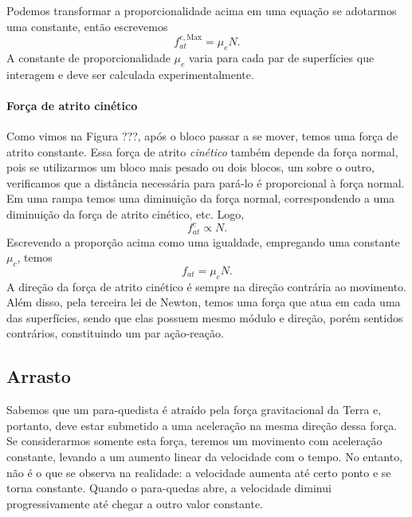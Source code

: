 Podemos transformar a proporcionalidade acima em uma equação se adotarmos uma constante, então escrevemos
\begin{equation}
  f_{at}^{e, \textrm{Max}} = \mu_e N.
\end{equation}
%
A constante de proporcionalidade $\mu_e$ varia para cada par de superfícies que interagem e deve ser calculada experimentalmente.

\paragraph{Força de atrito cinético} 

Como vimos na Figura ???, após o bloco passar a se mover, temos uma força de atrito constante. Essa força de atrito \emph{cinético} também depende da força normal, pois se utilizarmos um bloco mais pesado ou dois blocos, um sobre o outro, verificamos que a distância necessária para pará-lo é proporcional à força normal. Em uma rampa temos uma diminuição da força normal, correspondendo a uma diminuição da força de atrito cinético, etc. Logo,
\begin{equation}
  f_{at}^c \propto N.
\end{equation}
%
Escrevendo a proporção acima como uma igualdade, empregando uma constante $\mu_c$, temos
\begin{equation}
  f_{at} = \mu_c N.
\end{equation}
%
A direção da força de atrito cinético é sempre na direção contrária ao movimento. Além disso, pela terceira lei de Newton, temos uma força que atua em cada uma das superfícies, sendo que elas possuem mesmo módulo e direção, porém sentidos contrários, constituindo um par ação-reação.

\subsection{Arrasto}

Sabemos que um para-quedista é atraído pela força gravitacional da Terra e, portanto, deve estar submetido a uma aceleração na mesma direção dessa força. Se considerarmos somente esta força, teremos um movimento com aceleração constante, levando a um aumento linear da velocidade com o tempo. No entanto, não é o que se observa na realidade: a velocidade aumenta até certo ponto e se torna constante. Quando o para-quedas abre, a velocidade diminui progressivamente até chegar a outro valor constante.

